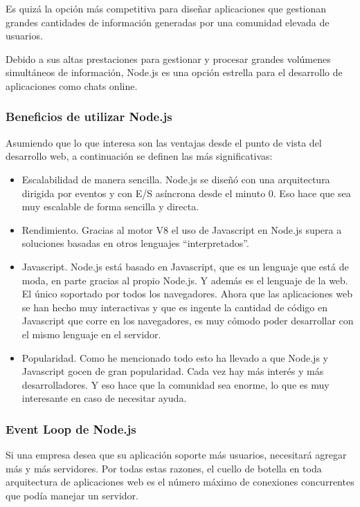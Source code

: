 Es quizá la opción más competitiva para diseñar aplicaciones que gestionan grandes cantidades de información generadas por una comunidad elevada de usuarios.

Debido a sus altas prestaciones para gestionar y procesar grandes volúmenes simultáneos de información, Node.js es una opción estrella para el desarrollo de aplicaciones como chats online.

\subsubsection{Beneficios de utilizar Node.js}

Asumiendo que lo que interesa son las ventajas desde el punto de vista del desarrollo web, a continuación se definen las más significativas:

\begin{itemize}
  \item Escalabilidad de manera sencilla. Node.js se diseñó con una arquitectura dirigida por eventos y con E/S asíncrona desde el minuto 0. Eso hace que sea muy escalable de forma sencilla y directa.
  \item Rendimiento. Gracias al motor V8 el uso de Javascript en Node.js supera a soluciones basadas en otros lenguajes “interpretados”.
  \item Javascript. Node.js está basado en Javascript, que es un lenguaje que está de moda, en parte gracias al propio Node.js. Y además es el lenguaje de la web. El único soportado por todos los navegadores. Ahora que las aplicaciones web se han hecho muy interactivas y que es ingente la cantidad de código en Javascript que corre en los navegadores, es muy cómodo poder desarrollar con el mismo lenguaje en el servidor.
  \item Popularidad. Como he mencionado todo esto ha llevado a que Node.js y Javascript gocen de gran popularidad. Cada vez hay más interés y más desarrolladores. Y eso hace que la comunidad sea enorme, lo que es muy interesante en caso de necesitar ayuda.
\end{itemize}

\subsubsection{Event Loop de Node.js}

Si una empresa desea que su aplicación soporte más usuarios, necesitará agregar más y más servidores. Por todas estas razones, el cuello de botella en toda arquitectura de aplicaciones web es el número máximo de conexiones concurrentes que podía manejar un servidor.

